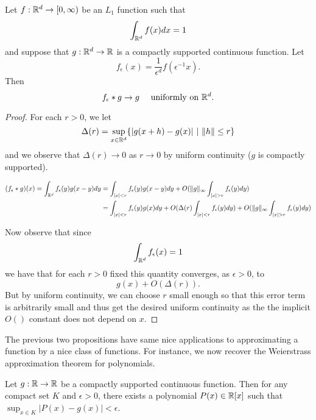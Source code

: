 \documentclass[twoside, a4paper, 10pt]{amsart}
\begin{document}
\begin{prop}\label{prop: approx identity} Let $f:\mathbb{R}^d \to [0,\infty)$ be an $L_1$ function such that $$\int_{\mathbb{R}^d} f(x) dx = 1$$ and suppose that $g:\mathbb{R}^d \to \mathbb{R}$ is a compactly supported continuous function. Let $$f_{\epsilon}(x) = \frac{1}{\epsilon^d}f(\epsilon^{-1} x).$$ Then $$f_{\epsilon} * g \to g \quad \text{ uniformly on } \mathbb{R}^d.$$

\end{prop}

\begin{proof} For each $r>0$, we let $$\Delta(r) = \sup_{x \in \mathbb{R}^d} \{ |g(x+h) - g(x)| ~|~ \|h\| \leq r \}$$ and we observe that $\Delta(r) \to 0$ as $r \to 0$ by uniform continuity ($g$ is compactly supported).

\begin{align*} (f_{\epsilon} *g)(x) = \int_{\bR^d} f_{\epsilon} (y) g(x-y) dy &= \int_{|x| < r} f_{\epsilon}(y) g(x-y) dy + O(\| g \|_{\infty} \int_{|x|>r} f_{\epsilon}(y) dy) \\ &= \int_{|x| < r} f_{\epsilon}(y) g(x) dy + O(\Delta(r) \int_{|x| < r} f_{\epsilon}(y) dy )  + O(\| g \|_{\infty} \int_{|x|>r} f_{\epsilon}(y) dy) \end{align*} 

Now observe that since $$\int_{\mathbb{R}^d} f_{\epsilon}(x) = 1$$ we have that for each $r>0$ fixed this quantity converges, as $\epsilon>0$, to $$g(x) + O(\Delta(r)).$$ But by uniform continuity, we can choose $r$ small enough so that this error term is arbitrarily small and thus get the desired uniform continuity as the the implicit $O()$ constant does not depend on $x$. \end{proof}

The previous two propositions have same nice applications to approximating a function by a nice class of functions. For instance, we now recover the Weierstrass approximation theorem for polynomials.

\begin{thm} Let $g:\mathbb{R} \to \mathbb{R}$ be a compactly supported continuous function. Then for any compact set $K$ and $\epsilon >0$, there exists a polynomial $P(x) \in \mathbb{R}[x]$ such that $\sup_{x \in K} |P(x) - g(x)| < \epsilon$.

\end{thm}
\end{document}
